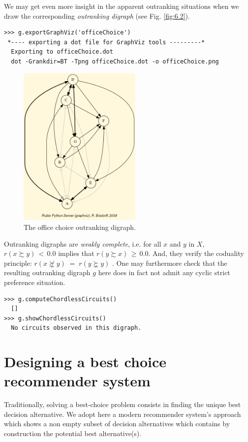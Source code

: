 We may get even more insight in the apparent outranking situations when we draw the corresponding \emph{outranking digraph} (see Fig. \ref{fig:6.2}).
\begin{lstlisting}
>>> g.exportGraphViz('officeChoice')
 *---- exporting a dot file for GraphViz tools ---------*
  Exporting to officeChoice.dot
  dot -Grankdir=BT -Tpng officeChoice.dot -o officeChoice.png
\end{lstlisting}
\begin{figure}[h]
\sidecaption
\includegraphics[width=6cm]{Figures/officeChoice.png}
\caption{The office choice outranking digraph.}
\label{fig:6.3}       %
\end{figure}

Outranking digraphs are \emph{weakly complete}, i.e. for all $x$ and $y$ in $X$, $r(x \succsim y)\, <\, 0.0$ implies that $r(y \succsim x)\, \geq\, 0.0$. And, they verify the coduality principle:  $r(x \not\succsim y) \;=\; r(y \succnsim y)$ \citep{BIS-2013}. One may furthermore check that the resulting outranking digraph $g$ here does in fact not admit any cyclic strict preference situation.
\begin{lstlisting}
>>> g.computeChordlessCircuits()
  []
>>> g.showChordlessCircuits()
  No circuits observed in this digraph.
\end{lstlisting}

\section{Designing a best choice recommender system}
\label{sec:6.3}

Traditionally, solving a best-choice problem consists in finding the unique best decision alternative. We adopt here a modern recommender system’s approach which shows a non empty subset of decision alternatives which contains by construction the potential best alternative(s).

